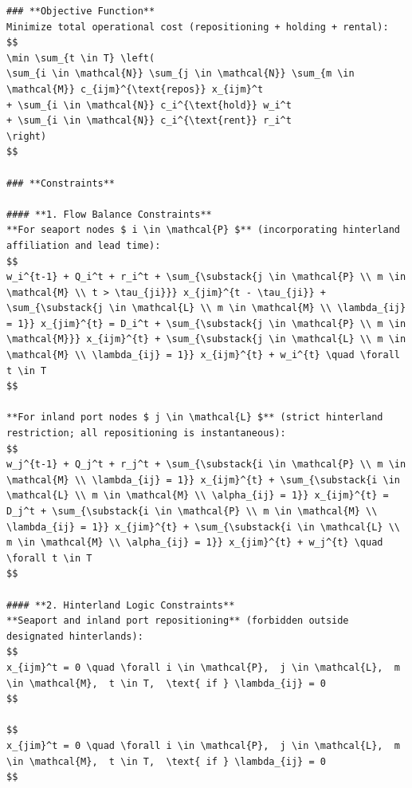 \documentclass[preprint,12pt]{elsarticle}
\begin{document}
\begin{nolinenumbers}
\begin{promptbox}
\begin{lstlisting}[style=prompttemplate]
### **Objective Function**
Minimize total operational cost (repositioning + holding + rental):
$$
\min \sum_{t \in T} \left(
\sum_{i \in \mathcal{N}} \sum_{j \in \mathcal{N}} \sum_{m \in \mathcal{M}} c_{ijm}^{\text{repos}} x_{ijm}^t
+ \sum_{i \in \mathcal{N}} c_i^{\text{hold}} w_i^t
+ \sum_{i \in \mathcal{N}} c_i^{\text{rent}} r_i^t
\right)
$$

### **Constraints**

#### **1. Flow Balance Constraints**
**For seaport nodes $ i \in \mathcal{P} $** (incorporating hinterland affiliation and lead time):
$$
w_i^{t-1} + Q_i^t + r_i^t + \sum_{\substack{j \in \mathcal{P} \\ m \in \mathcal{M} \\ t > \tau_{ji}}} x_{jim}^{t - \tau_{ji}} + \sum_{\substack{j \in \mathcal{L} \\ m \in \mathcal{M} \\ \lambda_{ij} = 1}} x_{jim}^{t} = D_i^t + \sum_{\substack{j \in \mathcal{P} \\ m \in \mathcal{M}}} x_{ijm}^{t} + \sum_{\substack{j \in \mathcal{L} \\ m \in \mathcal{M} \\ \lambda_{ij} = 1}} x_{ijm}^{t} + w_i^{t} \quad \forall t \in T
$$

**For inland port nodes $ j \in \mathcal{L} $** (strict hinterland restriction; all repositioning is instantaneous):
$$
w_j^{t-1} + Q_j^t + r_j^t + \sum_{\substack{i \in \mathcal{P} \\ m \in \mathcal{M} \\ \lambda_{ij} = 1}} x_{ijm}^{t} + \sum_{\substack{i \in \mathcal{L} \\ m \in \mathcal{M} \\ \alpha_{ij} = 1}} x_{ijm}^{t} = D_j^t + \sum_{\substack{i \in \mathcal{P} \\ m \in \mathcal{M} \\ \lambda_{ij} = 1}} x_{jim}^{t} + \sum_{\substack{i \in \mathcal{L} \\ m \in \mathcal{M} \\ \alpha_{ij} = 1}} x_{jim}^{t} + w_j^{t} \quad \forall t \in T
$$

#### **2. Hinterland Logic Constraints**
**Seaport and inland port repositioning** (forbidden outside designated hinterlands):
$$
x_{ijm}^t = 0 \quad \forall i \in \mathcal{P},  j \in \mathcal{L},  m \in \mathcal{M},  t \in T,  \text{ if } \lambda_{ij} = 0
$$

$$
x_{jim}^t = 0 \quad \forall i \in \mathcal{P},  j \in \mathcal{L},  m \in \mathcal{M},  t \in T,  \text{ if } \lambda_{ij} = 0
$$


\end{lstlisting}
\end{promptbox}
\end{nolinenumbers}
\end{document}

